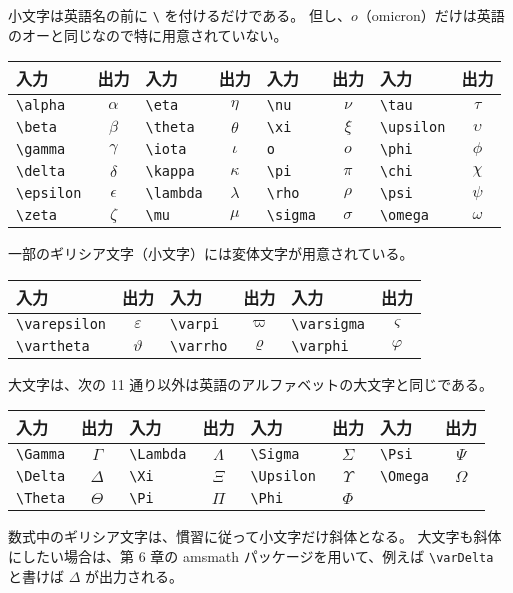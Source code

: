 小文字は英語名の前に \verb`\` を付けるだけである。
但し、$o$（omicron）だけは英語のオーと同じなので特に用意されていない。
\begin{longtable}{@{}lclclclc@{}}
    入力            & 出力       & 入力           & 出力      & 入力          & 出力     & 入力            & 出力       \\ \toprule
    \verb`\alpha`   & $\alpha$   & \verb`\eta`    & $\eta$    & \verb`\nu`    & $\nu$    & \verb`\tau`     & $\tau$     \\
    \verb`\beta`    & $\beta$    & \verb`\theta`  & $\theta$  & \verb`\xi`    & $\xi$    & \verb`\upsilon` & $\upsilon$ \\
    \verb`\gamma`   & $\gamma$   & \verb`\iota`   & $\iota$   & \verb`o`      & $o$      & \verb`\phi`     & $\phi$     \\
    \verb`\delta`   & $\delta$   & \verb`\kappa`  & $\kappa$  & \verb`\pi`    & $\pi$    & \verb`\chi`     & $\chi$     \\
    \verb`\epsilon` & $\epsilon$ & \verb`\lambda` & $\lambda$ & \verb`\rho`   & $\rho$   & \verb`\psi`     & $\psi$     \\
    \verb`\zeta`    & $\zeta$    & \verb`\mu`     & $\mu$     & \verb`\sigma` & $\sigma$ & \verb`\omega`   & $\omega$   \\
\end{longtable}
一部のギリシア文字（小文字）には変体文字が用意されている。
\begin{longtable}{@{}lclclc@{}}
    入力               & 出力          & 入力           & 出力      & 入力             & 出力        \\ \toprule
    \verb`\varepsilon` & $\varepsilon$ & \verb`\varpi`  & $\varpi$  & \verb`\varsigma` & $\varsigma$ \\
    \verb`\vartheta`   & $\vartheta$   & \verb`\varrho` & $\varrho$ & \verb`\varphi`   & $\varphi$   \\
\end{longtable}
大文字は、次の 11 通り以外は英語のアルファベットの大文字と同じである。
\begin{longtable}{@{}lclclclc@{}}
    入力          & 出力     & 入力           & 出力      & 入力            & 出力       & 入力          & 出力     \\ \toprule
    \verb`\Gamma` & $\Gamma$ & \verb`\Lambda` & $\Lambda$ & \verb`\Sigma`   & $\Sigma$   & \verb`\Psi`   & $\Psi$   \\
    \verb`\Delta` & $\Delta$ & \verb`\Xi`     & $\Xi$     & \verb`\Upsilon` & $\Upsilon$ & \verb`\Omega` & $\Omega$ \\
    \verb`\Theta` & $\Theta$ & \verb`\Pi`     & $\Pi$     & \verb`\Phi`     & $\Phi$     &               &          \\
\end{longtable}
数式中のギリシア文字は、慣習に従って小文字だけ斜体となる。
大文字も斜体にしたい場合は、第 6 章の amsmath パッケージを用いて、例えば \verb`\varDelta` と書けば $\varDelta$ が出力される。\\


